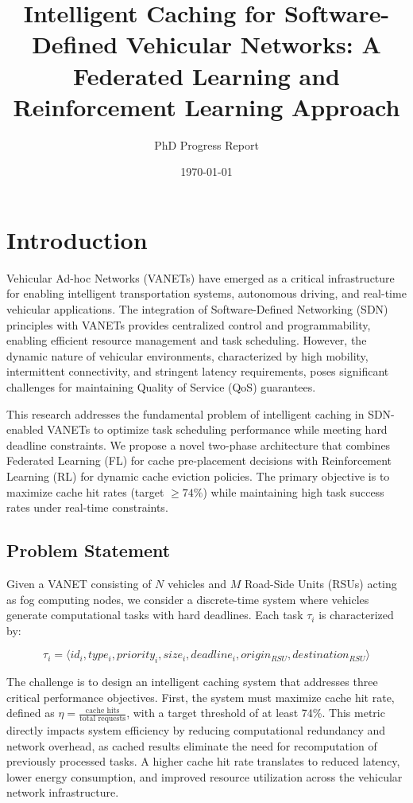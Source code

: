 \documentclass[11pt]{article}
\title{Intelligent Caching for Software-Defined Vehicular Networks: A Federated Learning and Reinforcement Learning Approach}
\author{PhD Progress Report}
\date{\today}
\begin{document}
\maketitle

\section{Introduction}

Vehicular Ad-hoc Networks (VANETs) have emerged as a critical infrastructure for enabling intelligent transportation systems, autonomous driving, and real-time vehicular applications. The integration of Software-Defined Networking (SDN) principles with VANETs provides centralized control and programmability, enabling efficient resource management and task scheduling. However, the dynamic nature of vehicular environments, characterized by high mobility, intermittent connectivity, and stringent latency requirements, poses significant challenges for maintaining Quality of Service (QoS) guarantees.

This research addresses the fundamental problem of intelligent caching in SDN-enabled VANETs to optimize task scheduling performance while meeting hard deadline constraints. We propose a novel two-phase architecture that combines Federated Learning (FL) for cache pre-placement decisions with Reinforcement Learning (RL) for dynamic cache eviction policies. The primary objective is to maximize cache hit rates (target $\geq 74\%$) while maintaining high task success rates under real-time constraints.

\subsection{Problem Statement}

Given a VANET consisting of $N$ vehicles and $M$ Road-Side Units (RSUs) acting as fog computing nodes, we consider a discrete-time system where vehicles generate computational tasks with hard deadlines. Each task $\tau_i$ is characterized by:

\begin{equation}
\tau_i = \langle id_i, type_i, priority_i, size_i, deadline_i, origin_{RSU}, destination_{RSU} \rangle
\end{equation}

The challenge is to design an intelligent caching system that addresses three critical performance objectives. First, the system must maximize cache hit rate, defined as $\eta = \frac{\text{cache hits}}{\text{total requests}}$, with a target threshold of at least 74\%. This metric directly impacts system efficiency by reducing computational redundancy and network overhead, as cached results eliminate the need for recomputation of previously processed tasks. A higher cache hit rate translates to reduced latency, lower energy consumption, and improved resource utilization across the vehicular network infrastructure.
\end{document}
